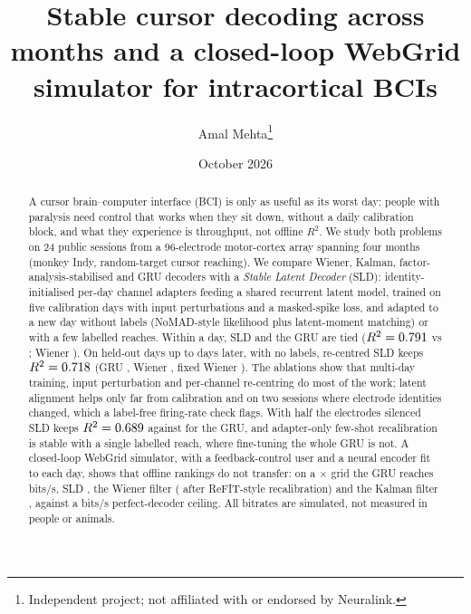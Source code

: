 \documentclass[10pt,twocolumn]{article}
\title{\textbf{Stable cursor decoding across months and a closed-loop WebGrid simulator for intracortical BCIs}}
\author{Amal Mehta\thanks{Independent project; not affiliated with or endorsed by Neuralink.}}
\date{October 2026}
\begin{document}
\maketitle

\begin{abstract}
A cursor brain--computer interface (BCI) is only as useful as its worst day: people with
paralysis need control that works when they sit down, without a daily calibration block,
and what they experience is throughput, not offline $R^2$. We study both problems on 24
public sessions from a 96-electrode motor-cortex array spanning four months (monkey Indy,
random-target cursor reaching). We compare Wiener, Kalman, factor-analysis-stabilised and GRU
decoders with a \emph{Stable Latent Decoder} (SLD): identity-initialised per-day channel adapters
feeding a shared recurrent latent model, trained on five calibration days with input
perturbations and a masked-spike loss, and adapted to a new day without labels (NoMAD-style
likelihood plus latent-moment matching) or with a few labelled reaches. Within a day, SLD and
the GRU are tied ($R^2=0.791$ vs \gruWithin; Wiener \wienerWithin). On \nKeep{} held-out
days up to \maxDay{} days later, with no labels, re-centred SLD keeps $R^2=0.718$ (GRU
\keepGruRc, Wiener \keepWienerRc, fixed Wiener \keepWienerFixed). The ablations show that
multi-day training, input perturbation and per-channel re-centring do most of the work; latent
alignment helps only far from calibration and on two sessions where electrode identities
changed, which a label-free firing-rate check flags. With half the electrodes silenced SLD keeps
$R^2=0.689$ against \stDropGruRcFifty{} for the GRU, and adapter-only few-shot
recalibration is stable with a single labelled reach, where fine-tuning the whole GRU is not. A closed-loop WebGrid simulator, with a
feedback-control user and a neural encoder fit to each day, shows that offline rankings do not
transfer: on a \gridSize$\times$\gridSize{} grid the GRU reaches \gruBps{} bits/s, SLD \sldBps,
the Wiener filter \wienerBps{} (\wienerRefitBps{} after ReFIT-style recalibration) and the Kalman
filter \kalmanBps, against a \oracleBps{} bits/s perfect-decoder ceiling. All bitrates are
simulated, not measured in people or animals.
\end{abstract}
\end{document}
